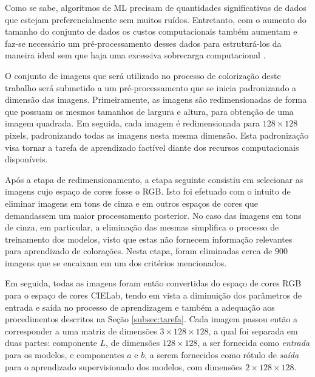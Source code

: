 Como se sabe, algoritmos de ML precisam de quantidades significativas de dados que estejam preferencialmente sem muitos ruídos. Entretanto, com o aumento do tamanho do conjunto de dados os custos computacionais também aumentam e faz-se necessário um pré-processamento desses dados para estruturá-los da maneira ideal sem que haja uma excessiva sobrecarga computacional \cite{ref:marsland}.

O conjunto de imagens que será utilizado no processo de colorização deste trabalho será submetido a um pré-processamento que se inicia padronizando a dimensão das imagens. Primeiramente, as imagens são redimensionadas de forma que possuam os mesmos tamanhos de largura e altura, para obtenção de uma imagem quadrada. Em seguida, cada imagem é redimensionada para $128 \times 128$ pixels, padronizando todas as imagens nesta mesma dimensão. Esta padronização visa tornar a tarefa de aprendizado factível diante dos recursos computacionais disponíveis.

Após a etapa de redimensionamento, a etapa seguinte consistiu em selecionar as imagens cujo espaço de cores fosse o RGB. Isto foi efetuado com o intuito de eliminar imagens em tons de cinza e em outros espaços de cores que demandassem um maior processamento posterior. No caso das imagens em tons de cinza, em particular, a eliminação das mesmas simplifica o processo de treinamento dos modelos, visto que estas não fornecem informação relevantes para aprendizado de colorações. Nesta etapa, foram eliminadas cerca de $900$ imagens que se encaixam em um dos critérios mencionados.

Em seguida, todas as imagens foram então convertidas do espaço de cores RGB para o espaço de cores CIELab, tendo em vista a diminuição dos parâmetros de entrada e saída no processo de aprendizagem e também a adequação aos procedimentos descritos na Seção \ref{subsec:tarefa}. Cada imagem passou então a corresponder a uma matriz de dimensões $3\times 128 \times 128$, a qual foi separada em duas partes: componente $L$, de dimensões $128 \times 128$, a ser fornecida como \emph{entrada} para os modelos, e componentes $a$ e $b$, a serem fornecidos como rótulo de \emph{saída} para o aprendizado supervisionado dos modelos, com dimensões $2 \times 128 \times 128$.
